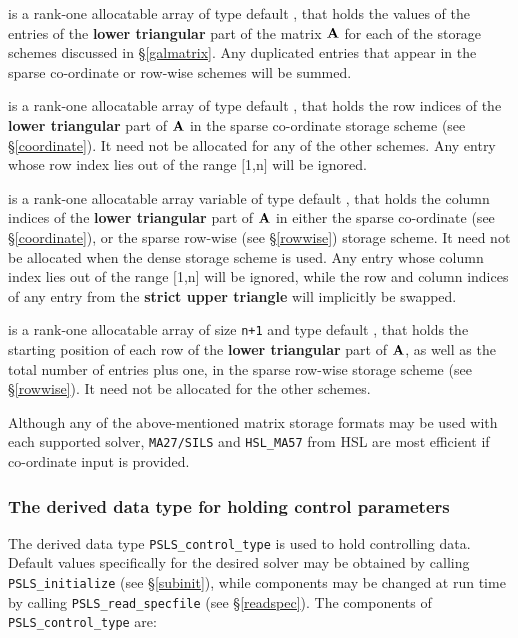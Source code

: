 \documentclass{galahad}
\newcommand{\packagename}{PSLS}
\begin{document}
\begin{description}
 is a rank-one allocatable array of type default \realdp, that holds
the values of the entries of the {\bf lower triangular} part
of the matrix ${\mathbf{A}}$ for each of the
storage schemes discussed in \S\ref{galmatrix}.
Any duplicated entries that appear in the sparse
co-ordinate or row-wise schemes will be summed.

 is a rank-one allocatable array of type default \integer,
that holds the row indices of the {\bf lower triangular} part of ${\mathbf{A}}$
in the sparse co-ordinate storage
scheme (see \S\ref{coordinate}).
It need not be allocated for any of the other schemes.
Any entry whose row index lies out of the range $[$1,n$]$ will be ignored.

 is a rank-one allocatable array variable of type default \integer,
that holds the column indices of the {\bf lower triangular} part of
${\mathbf{A}}$ in either the sparse co-ordinate
(see \S\ref{coordinate}), or the sparse row-wise
(see \S\ref{rowwise}) storage scheme.
It need not be allocated when the dense
storage scheme is used.
Any entry whose column index lies out of the range $[$1,n$]$ will be ignored,
while the row and column indices of any entry from the
{\bf strict upper triangle} will implicitly be swapped.

 is a rank-one allocatable array of size {\tt n+1} and type
default \integer, that holds the starting position of
each row of the {\bf lower triangular} part of ${\mathbf{A}}$, as well
as the total number of entries plus one, in the sparse row-wise storage
scheme (see \S\ref{rowwise}). It need not be allocated for the
other schemes.

\end{description}
Although any of the above-mentioned matrix storage formats may be used
with each supported solver, {\tt MA27/SILS} and {\tt HSL\_MA57}
from HSL are most efficient if co-ordinate input is provided.


\subsubsection{The derived data type for holding control
 parameters}\label{typecontrol}
The derived data type
{\tt \packagename\_control\_type}
is used to hold controlling data.
Default values specifically for the desired solver
may be obtained by calling
{\tt \packagename\_initialize}
(see \S\ref{subinit}),
while components may be changed at run time by calling
{\tt \packagename\_read\-\_specfile}
(see \S\ref{readspec}).
The components of
{\tt \packagename\_control\_type}
are:
\end{document}

